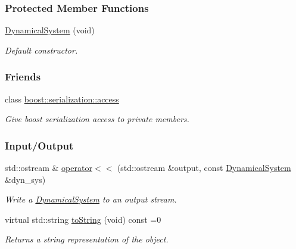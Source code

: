 \subsubsection*{Protected Member Functions}
\begin{DoxyCompactItemize}
\item 
\hyperlink{classDmpBbo_1_1DynamicalSystem_a2619319384507480c48e61850037a461}{Dynamical\+System} (void)
\begin{DoxyCompactList}\small\item\em Default constructor. \end{DoxyCompactList}\end{DoxyCompactItemize}
\subsubsection*{Friends}
\begin{DoxyCompactItemize}
\item 
class \hyperlink{classDmpBbo_1_1DynamicalSystem_ac98d07dd8f7b70e16ccb9a01abf56b9c}{boost\+::serialization\+::access}
\begin{DoxyCompactList}\small\item\em Give boost serialization access to private members. \end{DoxyCompactList}\end{DoxyCompactItemize}
\subsubsection*{Input/\+Output}
\begin{DoxyCompactItemize}
\item 
std\+::ostream \& \hyperlink{classDmpBbo_1_1DynamicalSystem_ad76e679d6bbbe29fc09345e54c4262ab}{operator$<$$<$} (std\+::ostream \&output, const \hyperlink{classDmpBbo_1_1DynamicalSystem}{Dynamical\+System} \&dyn\+\_\+sys)
\begin{DoxyCompactList}\small\item\em Write a \hyperlink{classDmpBbo_1_1DynamicalSystem}{Dynamical\+System} to an output stream. \end{DoxyCompactList}\item 
virtual std\+::string \hyperlink{classDmpBbo_1_1DynamicalSystem_af084bff2ddd6233e9a898faa23f6195c}{to\+String} (void) const =0
\begin{DoxyCompactList}\small\item\em Returns a string representation of the object. \end{DoxyCompactList}\end{DoxyCompactItemize}

